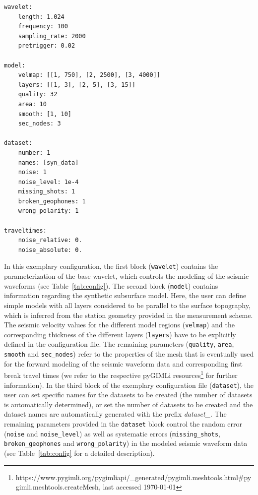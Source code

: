 \documentclass[a4paper,fleqn]{cas-sc}
\begin{document}
\begin{footnotesize}
\begin{verbatim}
wavelet:
    length: 1.024
    frequency: 100
    sampling_rate: 2000
    pretrigger: 0.02

model:
    velmap: [[1, 750], [2, 2500], [3, 4000]]
    layers: [[1, 3], [2, 5], [3, 15]]
    quality: 32
    area: 10
    smooth: [1, 10]
    sec_nodes: 3    

dataset:
    number: 1
    names: [syn_data]
    noise: 1
    noise_level: 1e-4
    missing_shots: 1
    broken_geophones: 1
    wrong_polarity: 1
    
traveltimes:
    noise_relative: 0.
    noise_absolute: 0.
\end{verbatim}
\end{footnotesize}

In this exemplary configuration, the first block (\texttt{wavelet}) contains the parameterization of the base wavelet, which controls the modeling of the seismic waveforms (see Table~\ref{tab:config}).
The second block (\texttt{model}) contains information regarding the synthetic subsurface model. Here, the user can define simple models with all layers considered to be parallel to the surface topography, which is inferred from the station geometry provided in the measurement scheme. The seismic velocity values for the different model regions (\texttt{velmap}) and the corresponding thickness of the different layers (\texttt{layers}) have to be explicitly defined in the configuration file. The remaining parameters (\texttt{quality}, \texttt{area}, \texttt{smooth} and \texttt{sec\_nodes}) refer to the properties of the mesh that is eventually used for the forward modeling of the seismic waveform data and corresponding first break travel times (we refer to the respective pyGIMLi resources\footnote{https://www.pygimli.org/pygimliapi/\_generated/pygimli.meshtools.html\#pygimli.meshtools.createMesh, last accessed \today} for further information).
In the third block of the exemplary configuration file (\texttt{dataset}), the user can set specific names for the datasets to be created (the number of datasets is automatically determined), or set the number of datasets to be created and the dataset names are automatically generated with the prefix \textit{dataset\_}.
The remaining parameters provided in the \texttt{dataset} block control the random error (\texttt{noise} and \texttt{noise\_level}) as well as systematic errors (\texttt{missing\_shots}, \texttt{broken\_geophones} and \texttt{wrong\_polarity}) in the modeled seismic waveform data (see Table~\ref{tab:config} for a detailed description).
\end{document}
